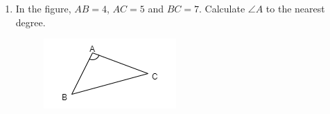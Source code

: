 \documentclass[11pt]{article}
\begin{document}
\begin{enumerate}
        \hrulefill
        
        \hrulefill

        \hrulefill

        \hrulefill
            
        \hrulefill
        
        \hrulefill
        
        \hrulefill
        
        \hrulefill
        
        \hrulefill
        
        \hrulefill
        
        \hrulefill
        
        \hrulefill
        
        \hrulefill
        
        \hrulefill

        \hrulefill

        \hrulefill
            
        \hrulefill
        
        \hrulefill
        
        \hrulefill
        
        \hrulefill
        
        \hrulefill
        
        \hrulefill
        
        \hrulefill
        
        \hrulefill
        
        \hrulefill
        
        \hrulefill
            
        \hrulefill
        
        \hrulefill
        
        \hrulefill
        
        \hrulefill
        
        \hrulefill
        
        \hrulefill
        
        \hrulefill
        
        \hrulefill
        
        \hrulefill
        
        \hrulefill

    \pagebreak
    \item In the figure, $AB=4$, $AC=5$ and $BC=7$. Calculate $\angle A$ to the nearest degree.\begin{figure}[H]
        \centering
        \includegraphics[scale=0.8]{f4finalq38.png}
    \end{figure}


\end{enumerate}
\end{document}
